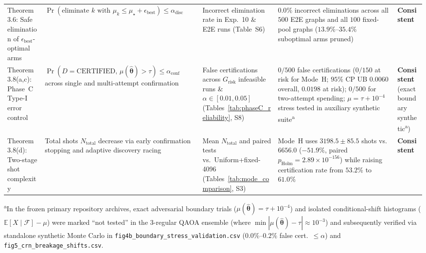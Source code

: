 \begin{table}[htbp]
\begin{tabular}{@{}p{2.5cm} p{3.6cm} p{2.9cm} p{5.4cm} p{2.2cm}@{}}
Theorem~3.6: Safe elimination of $\epsilon_{\mathrm{best}}$-optimal arms & $\Pr(\text{eliminate } k \text{ with } \mu_k \le \mu_\star+\epsilon_{\mathrm{best}}) \le \alpha_{\mathrm{disc}}$ & Incorrect elimination rate in Exp.~10 \& E2E runs (Table~S6) & $0.0\%$ incorrect eliminations across all $500$ E2E graphs and all $100$ fixed-pool graphs ($13.9\%\text{--}35.4\%$ suboptimal arms pruned) & \textbf{Consistent} \\
Theorem~3.8(a,c): Phase~C Type-I error control & $\Pr(D=\mathrm{CERTIFIED},\, \mu(\hat{\bm{\theta}})>\tau) \le \alpha_{\mathrm{conf}}$ across single and multi-attempt confirmation & False certifications across $G_{\mathrm{risk}}$ infeasible runs \& $\alpha \in [0.01,0.05]$ (Tables~\ref{tab:phaseC_reliability}, S8) & $0/500$ false certifications ($0/150$ at risk for Mode~H; $95\%$ CP UB $0.0060$ overall, $0.0198$ at risk); $0/500$ for two-attempt spending; $\mu=\tau+10^{-4}$ stress tested in auxiliary synthetic suite\textsuperscript{a} & \textbf{Consistent} (exact boundary synthetic\textsuperscript{a}) \\
Theorem~3.8(d): Two-stage shot complexity & Total shots $N_{\mathrm{total}}$ decrease via early confirmation stopping and adaptive discovery racing & Mean $N_{\mathrm{total}}$ and paired tests vs.\ Uniform+fixed-4096 (Tables~\ref{tab:mode_comparison}, S3) & Mode~H uses $3198.5 \pm 85.5$ shots vs.\ $6656.0$ ($-51.9\%$, paired $p_{\mathrm{Holm}} = 2.89\times 10^{-156}$) while raising certification rate from $53.2\%$ to $61.0\%$ & \textbf{Consistent} \\
\bottomrule
\end{tabular}
\vspace{0.3em}
\par\noindent\footnotesize\textsuperscript{a}In the frozen primary repository archives, exact adversarial boundary trials ($\mu(\hat{\bm{\theta}})=\tau+10^{-4}$) and isolated conditional-shift histograms ($\mathbb{E}[X\mid\mathcal{F}]-\mu$) were marked ``not tested'' in the 3-regular QAOA ensemble (where $\min|\mu(\hat{\bm{\theta}})-\tau|\approx 10^{-3}$) and subsequently verified via standalone synthetic Monte Carlo in \texttt{fig4b\_boundary\_stress\_validation.csv} ($0.0\%\text{--}0.2\%$ false cert.\ $\le \alpha$) and \texttt{fig5\_crn\_breakage\_shifts.csv}.
\end{table}
